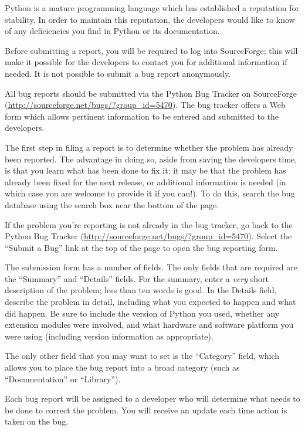 \label{reporting-bugs}

Python is a mature programming language which has established a
reputation for stability.  In order to maintain this reputation, the
developers would like to know of any deficiencies you find in Python
or its documentation.

Before submitting a report, you will be required to log into SourceForge;
this will make it possible for the developers to contact you
for additional information if needed.  It is not possible to submit a
bug report anonymously.

All bug reports should be submitted via the Python Bug Tracker on
SourceForge (\url{http://sourceforge.net/bugs/?group_id=5470}).  The
bug tracker offers a Web form which allows pertinent information to be
entered and submitted to the developers.

The first step in filing a report is to determine whether the problem
has already been reported.  The advantage in doing so, aside from
saving the developers time, is that you learn what has been done to
fix it; it may be that the problem has already been fixed for the next
release, or additional information is needed (in which case you are
welcome to provide it if you can!).  To do this, search the bug
database using the search box near the bottom of the page.

If the problem you're reporting is not already in the bug tracker, go
back to the Python Bug Tracker
(\url{http://sourceforge.net/bugs/?group_id=5470}).  Select the
``Submit a Bug'' link at the top of the page to open the bug reporting
form.

The submission form has a number of fields.  The only fields that are
required are the ``Summary'' and ``Details'' fields.  For the summary,
enter a \emph{very} short description of the problem; less than ten
words is good.  In the Details field, describe the problem in detail,
including what you expected to happen and what did happen.  Be sure to
include the version of Python you used, whether any extension modules
were involved, and what hardware and software platform you were using
(including version information as appropriate).

The only other field that you may want to set is the ``Category''
field, which allows you to place the bug report into a broad category
(such as ``Documentation'' or ``Library'').

Each bug report will be assigned to a developer who will determine
what needs to be done to correct the problem.  You will
receive an update each time action is taken on the bug.


